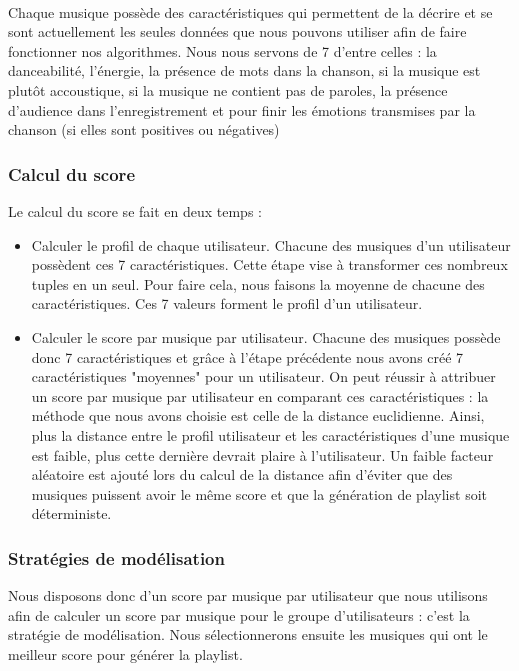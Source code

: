 \documentclass{article}
\begin{document}
        \paragraph{} Chaque musique possède des caractéristiques qui permettent de la décrire et se sont actuellement les seules données que nous pouvons utiliser afin de faire fonctionner nos algorithmes. Nous nous servons de 7 d'entre celles : la danceabilité, l'énergie, la présence de mots dans la chanson, si la musique est plutôt accoustique, si la musique ne contient pas de paroles, la présence d'audience dans l'enregistrement et pour finir les émotions transmises par la chanson (si elles sont positives ou négatives)
 		\subsubsection{Calcul du score} Le calcul du score se fait en deux temps : 
 		\begin{itemize}
 		    \item Calculer le profil de chaque utilisateur. Chacune des musiques d'un utilisateur possèdent ces 7 caractéristiques. Cette étape vise à transformer ces nombreux tuples en un seul. Pour faire cela, nous faisons la moyenne de chacune des caractéristiques. Ces 7 valeurs forment le profil d'un utilisateur.
 		    \item Calculer le score par musique par utilisateur. Chacune des musiques possède donc 7 caractéristiques et grâce à l'étape précédente nous avons créé 7 caractéristiques "moyennes" pour un utilisateur. On peut réussir à attribuer un score par musique par utilisateur en comparant ces caractéristiques : la méthode que nous avons choisie est celle de la distance euclidienne. Ainsi, plus la distance entre le profil utilisateur et les caractéristiques d'une musique est faible, plus cette dernière devrait plaire à l'utilisateur. Un faible facteur aléatoire est ajouté lors du calcul de la distance afin d'éviter que des musiques puissent avoir le même score et que la génération de playlist soit déterministe. 
 		\end{itemize}
		
		\subsubsection{Stratégies de modélisation}
		Nous disposons donc d'un score par musique par utilisateur que nous utilisons afin de calculer un score par musique pour le groupe d'utilisateurs : c'est la stratégie de modélisation. Nous sélectionnerons ensuite les musiques qui ont le meilleur score pour générer la playlist. 
\end{document}
